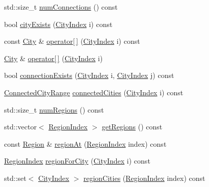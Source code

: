\begin{DoxyCompactItemize}
std\+::size\+\_\+t \hyperlink{classpan_1_1_map_a70b6a65dc76e8911beb524062a2d09a9}{num\+Connections} () const
\item 
bool \hyperlink{classpan_1_1_map_a331d27d9fe199aea61b6ed76b4950d55}{city\+Exists} (\hyperlink{namespacepan_afaed28aa6603153dcc062a028602d697}{City\+Index} i) const
\item 
const \hyperlink{classpan_1_1_city}{City} \& \hyperlink{classpan_1_1_map_a0f7820b581ca27511a687618f01dce2d}{operator\mbox{[}$\,$\mbox{]}} (\hyperlink{namespacepan_afaed28aa6603153dcc062a028602d697}{City\+Index} i) const
\item 
\hyperlink{classpan_1_1_city}{City} \& \hyperlink{classpan_1_1_map_ab9e03b7854710fdbd279e62c2494ef06}{operator\mbox{[}$\,$\mbox{]}} (\hyperlink{namespacepan_afaed28aa6603153dcc062a028602d697}{City\+Index} i)
\item 
bool \hyperlink{classpan_1_1_map_ae6644155d9ddd28d82ab393e62024637}{connection\+Exists} (\hyperlink{namespacepan_afaed28aa6603153dcc062a028602d697}{City\+Index} i, \hyperlink{namespacepan_afaed28aa6603153dcc062a028602d697}{City\+Index} j) const
\item 
\hyperlink{classpan_1_1_map_a6b1e81229ca2ed5c67202254948bde9b}{Connected\+City\+Range} \hyperlink{classpan_1_1_map_a1cb8308c1ddac316a683be688277a25a}{connected\+Cities} (\hyperlink{namespacepan_afaed28aa6603153dcc062a028602d697}{City\+Index} i) const
\item 
std\+::size\+\_\+t \hyperlink{classpan_1_1_map_a7e61225a4309562a5b8df58acb325276}{num\+Regions} () const
\item 
std\+::vector$<$ \hyperlink{namespacepan_a648dcc32a76222a9e4cd4a3e80bda642}{Region\+Index} $>$ \hyperlink{classpan_1_1_map_a580c57ef43aaf9c4c964d18340754d3c}{get\+Regions} () const
\item 
const \hyperlink{classpan_1_1_region}{Region} \& \hyperlink{classpan_1_1_map_ac0597ceffd926725744a6518c7773421}{region\+At} (\hyperlink{namespacepan_a648dcc32a76222a9e4cd4a3e80bda642}{Region\+Index} index) const
\item 
\hyperlink{namespacepan_a648dcc32a76222a9e4cd4a3e80bda642}{Region\+Index} \hyperlink{classpan_1_1_map_af477415a73c3e1fed14f1bd3753da6b1}{region\+For\+City} (\hyperlink{namespacepan_afaed28aa6603153dcc062a028602d697}{City\+Index} i) const
\item 
std\+::set$<$ \hyperlink{namespacepan_afaed28aa6603153dcc062a028602d697}{City\+Index} $>$ \hyperlink{classpan_1_1_map_a6c28ef7bcc328fa4260309aa14f50f8a}{region\+Cities} (\hyperlink{namespacepan_a648dcc32a76222a9e4cd4a3e80bda642}{Region\+Index} index) const
\end{DoxyCompactItemize}
